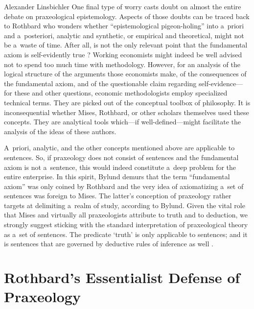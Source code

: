 \begin{artengenv}{Alexander Linsbichler}
One final type of worry casts doubt on almost the entire debate on praxeological epistemology. Aspects of those doubts can be traced back to Rothbard who wonders whether ``epistemological pigeon-holing'' into a~priori and a~posteriori, analytic and synthetic, or empirical and theoretical, might not be a~waste of time. After all, is not the only relevant point that the fundamental axiom is self-evidently true 
\parencite[see e.g.][p.318]{rothbard_defense_1957}? %
 Working economists might indeed be well advised not to spend too much time with methodology. However, for an analysis of the logical structure of the arguments those economists make, of the consequences of the fundamental axiom, and of the questionable claim regarding self-evidence---for these and other questions, economic methodologists employ specialized technical terms. They are picked out of the conceptual toolbox of philosophy. It is inconsequential whether Mises, Rothbard, or other scholars themselves used these concepts. They are analytical tools which---if well-defined---might facilitate the analysis of the ideas of these authors.



A~priori, analytic, and the other concepts mentioned above are applicable to sentences. So, if praxeology does not consist of sentences and the fundamental axiom is not a~sentence, this would indeed constitute a~deep problem for the entire enterprise. In this spirit, Bylund 
\parencite*[][]{bylund_alexander_2023} %
 demurs that the term ``fundamental axiom'' was only coined by Rothbard and the very idea of axiomatizing a~set of sentences was foreign to Mises. The latter's conception of praxeology rather targets at delimiting a~realm of study, according to Bylund. Given the vital role that Mises and virtually all praxeologists attribute to truth and to deduction, we strongly suggest sticking with the standard interpretation of praxeological theory as a~set of sentences. The predicate ‘truth' is only applicable to sentences; and it is sentences that are governed by deductive rules of inference as well 
\parencite[][]{linsbichler_ultra-refined_2023}.%




\section{Rothbard's Essentialist Defense of Praxeology}


\end{artengenv}
